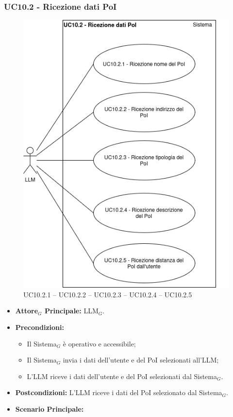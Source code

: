 \documentclass[10pt]{article}
\begin{document}
\begin{justify}
\subsubsection{\textbf{UC10.2 - Ricezione dati PoI}}
\begin{figure}[H]
    \centering
    \includegraphics[width=0.7\linewidth]{UC10.2image.png}
    \caption{UC10.2.1 -- UC10.2.2 -- UC10.2.3 -- UC10.2.4 -- UC10.2.5}
    \label{fig:UC10.2}
\end{figure}
\label{UC10.2}
\begin{itemize}
    \item \textbf{Attore$_G$ Principale:} LLM$_G$.
    \item \textbf{Precondizioni:} 
        \begin{itemize}
          \item Il Sistema$_G$ è operativo e accessibile;
          \item Il Sistema$_G$ invia i dati dell'utente e del PoI selezionati all'LLM;
            \item L'LLM riceve i dati dell'utente e del PoI selezionati dal Sistema$_G$.
        \end{itemize}
      \item \textbf{Postcondizioni:} L'LLM riceve i dati del PoI selezionato dal Sistema$_G$.
    \item \textbf{Scenario Principale:} 
        \begin{enumerate}

\end{enumerate}
\end{itemize}
\end{justify}
\end{document}
